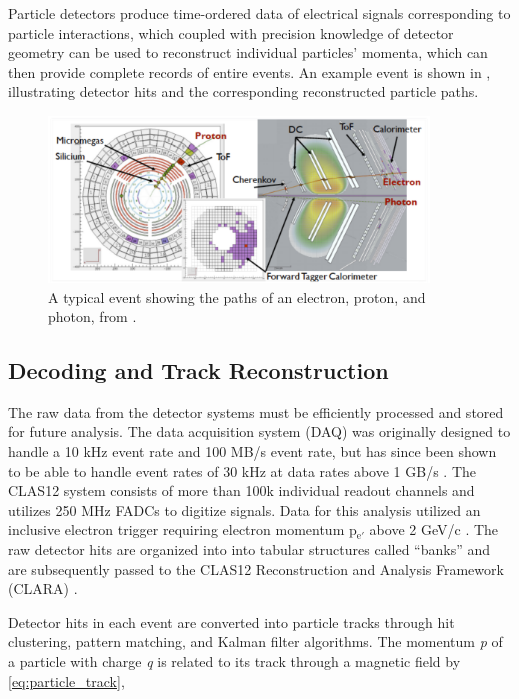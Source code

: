 Particle detectors produce time-ordered data of electrical signals corresponding to particle interactions, which coupled with precision knowledge of detector geometry can be used to reconstruct individual particles' momenta, which can then provide complete records of entire events. An example event is shown in , illustrating detector hits and the corresponding reconstructed particle paths.

\begin{figure}[htb]
    \centering
    \includegraphics[width=0.9\textwidth]{Chapters/Ch2-Experiment/recon_pid/pid_figs/example_track.png}
    \caption[Example Event Tracks]{A typical event showing the paths of an electron, proton, and photon, from \parencite{Battaglieri2021PresentProgram}.}
    \label{fig:example-track}
\end{figure}


\subsection{Decoding and Track Reconstruction}\label{sec:decoding_reconstruction}
    The raw data from the detector systems must be efficiently processed and stored for future analysis. The data acquisition system (DAQ) was originally designed to handle a 10 kHz event rate and 100 MB/s event rate, but has since been shown to be able to handle event rates of 30 kHz at data rates above 1 GB/s \parencite{Boyarinov2020TheSystem}.  The CLAS12 system consists of more than 100k individual readout channels and utilizes 250 MHz FADCs to digitize signals. Data for this analysis utilized an inclusive electron trigger requiring electron momentum p$_{\mathrm{e'}}$ above 2 GeV/c \parencite{Raydo2020TheSystem}. The raw detector hits are organized into into tabular structures called ``banks'' and are subsequently passed to the CLAS12 Reconstruction and Analysis Framework (CLARA) \parencite{Gyurgyan2016CLARA:Framework}.

    Detector hits in each event are converted into particle tracks through hit clustering, pattern matching, and Kalman filter algorithms. The momentum \textit{p} of a particle with charge \textit{q} is related to its track through a magnetic field by \eqref{eq:particle_track},
    
